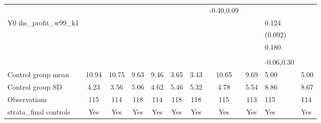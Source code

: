 \begin{table}[!h]
\begin{adjustbox}{width=\columnwidth,center}
\begin{tabular}{l*{8}{c}}
                    &                     &                     &                     &                     &                     &                     &  -0.40,0.09         &                     &                     &                     \\
Y0 ihs\_profit\_w99\_k1&                     &                     &                     &                     &                     &                     &                     &                     &       0.124         &                     \\
                    &                     &                     &                     &                     &                     &                     &                     &                     &     (0.092)         &                     \\
                    &                     &                     &                     &                     &                     &                     &                     &                     &       0.180         &                     \\
                    &                     &                     &                     &                     &                     &                     &                     &                     &                     &                     \\
                    &                     &                     &                     &                     &                     &                     &                     &                     &  -0.06,0.30         &                     \\
\hline
Control group mean  &       10.94         &       10.75         &        9.63         &        9.46         &        3.65         &        3.43         &       10.65         &        9.69         &        5.00         &        5.00         \\
Control group SD    &        4.23         &        3.56         &        5.06         &        4.62         &        5.46         &        5.32         &        4.78         &        5.54         &        8.86         &        8.67         \\
Observations        &         115         &         114         &         118         &         114         &         118         &         118         &         115         &         113         &         115         &         114         \\
strata\_final controls&         Yes         &         Yes         &         Yes         &         Yes         &         Yes         &         Yes         &         Yes         &         Yes         &         Yes         &         Yes         \\

\end{tabular}
\end{adjustbox}
\end{table}

